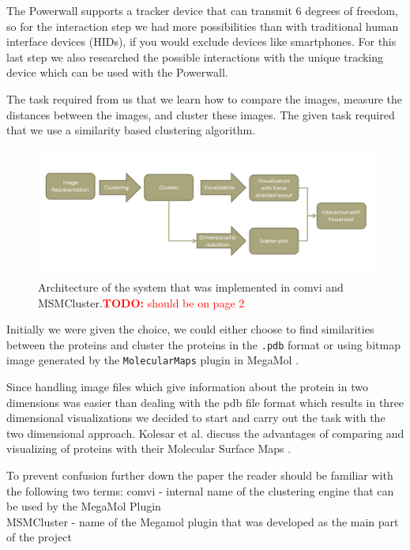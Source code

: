 \documentclass[journal]{vgtc}       %
\newcommand{\todo}[1]{\textcolor{red}{\textbf{TODO:} #1}}
\begin{document}
The Powerwall supports a tracker device that can transmit 6 degrees of freedom, so for the interaction step we had more possibilities than with traditional human interface  devices  (HIDs), if you would exclude devices like smartphones. For this last step we also researched the possible interactions with the unique tracking device  which can be used  with the  Powerwall.

The task required from us that we learn how to compare the images, measure the distances between the images, and cluster these images.
The given task required that we use a similarity based clustering algorithm.
\begin{figure}[h!]
	\begin{center}
		\includegraphics[width=.75\linewidth]{Architecture2.png}
	\end{center}
	\caption{\label{fig:arch} Architecture of the system that was implemented in comvi and MSMCluster.\todo{should be on page 2}}
\end{figure} 
Initially we were given the choice, we could either choose to find similarities between the proteins and cluster the proteins in the \verb|.pdb| format or using bitmap image generated by the \verb|MolecularMaps| plugin in MegaMol \cite{molecularmaps}.

Since handling image files which give information about the protein in two dimensions was easier than dealing with the pdb file format which results in three dimensional visualizations we decided to start and carry out the task with the two dimensional approach. Kolesar et al. discuss the advantages of comparing and visualizing of proteins with their Molecular Surface Maps \cite{kolesar}.

To prevent confusion further down the paper  the reader should be familiar with the following two terms: comvi - internal name of the clustering engine that can be used by the MegaMol Plugin \\
MSMCluster - name of the Megamol plugin that was developed as the main part of the project 
\end{document}
